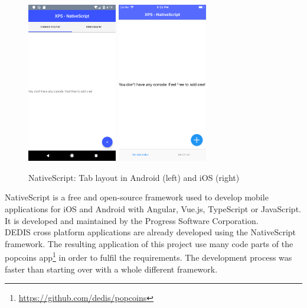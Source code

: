 \documentclass[11pt, a4paper, twoside, openright]{article} %
\begin{document}
{\begin{figure}[!htb]
	\centering
	\includegraphics[width=0.35\textwidth]{img/NativeScript_layout_android.png}
	\includegraphics[width=0.35\textwidth]{img/NativeScript_layout_ios.png}
	
	\caption{NativeScript: Tab layout in Android (left) and iOS (right)}
	\label{fig:nativescript_layout_comparison}
\end{figure}

NativeScript is a free and open-source framework used to develop mobile applications for iOS and Android with Angular, Vue.js, TypeScript or JavaScript. It is developed and maintained by the Progress Software Corporation.\\
DEDIS cross platform applications are already developed using the NativeScript framework. The resulting application of this project use many code parts of the popcoins app\footnote{\url{https://github.com/dedis/popcoins}} in order to fulfil the requirements. The development process was faster than starting over with a whole different framework.\\

}
\end{document}
